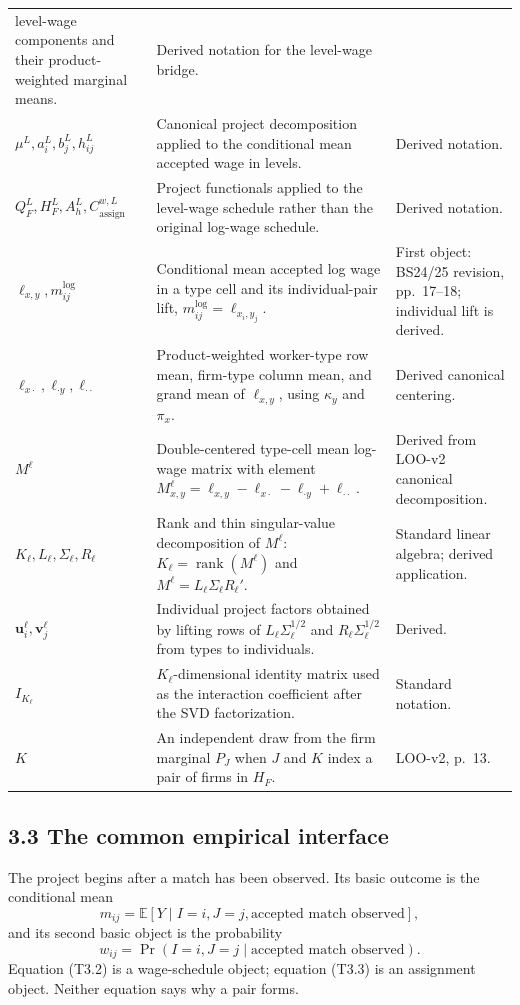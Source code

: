 \documentclass[11pt]{article}
\begin{document}
\begin{longtable}{p{}p{}p{}}
level-wage components and their product-weighted marginal means. & Derived
notation for the level-wage bridge. \\
\(\mu^L,a_i^L,b_j^L,h_{ij}^L\) & Canonical project decomposition applied to
the conditional mean accepted wage in levels. & Derived notation. \\
\(Q_F^L,H_F^L,A_h^L,C_{\mathrm{assign}}^{w,L}\) & Project functionals applied
to the level-wage schedule rather than the original log-wage schedule. &
Derived notation. \\
\(\ell_{x,y},m^{\log}_{ij}\) & Conditional mean accepted log wage in a type
cell and its individual-pair lift,
\(m^{\log}_{ij}=\ell_{x_i,y_j}\). & First object: BS24/25 revision,
pp.\ 17--18; individual lift is derived. \\
\(\ell_{x\cdot},\ell_{\cdot y},\ell_{\cdot\cdot}\) & Product-weighted
worker-type row mean, firm-type column mean, and grand mean of
\(\ell_{x,y}\), using \(\kappa_y\) and \(\pi_x\). & Derived canonical
centering. \\
\(M^\ell\) & Double-centered type-cell mean log-wage matrix with element
\(M^\ell_{x,y}=\ell_{x,y}-\ell_{x\cdot}-\ell_{\cdot y}
+\ell_{\cdot\cdot}\). & Derived from LOO-v2 canonical decomposition. \\
\(K_\ell,L_\ell,\Sigma_\ell,R_\ell\) & Rank and thin singular-value
decomposition of \(M^\ell\):
\(K_\ell=\operatorname{rank}(M^\ell)\) and
\(M^\ell=L_\ell\Sigma_\ell R_\ell'\). & Standard linear algebra; derived
application. \\
\(\mathbf u_i^\ell,\mathbf v_j^\ell\) & Individual project factors obtained
by lifting rows of \(L_\ell\Sigma_\ell^{1/2}\) and
\(R_\ell\Sigma_\ell^{1/2}\) from types to individuals. & Derived. \\
\(I_{K_\ell}\) & \(K_\ell\)-dimensional identity matrix used as the
interaction coefficient after the SVD factorization. & Standard notation. \\
\(K\) & An independent draw from the firm marginal \(P_J\) when \(J\) and
\(K\) index a pair of firms in \(H_F\). & LOO-v2, p.\ 13. \\
\end{longtable}

\subsection{3.3 The common empirical interface}

The project begins after a match has been observed.  Its basic outcome is the
conditional mean
\[
m_{ij}
=
\mathbb E[
  Y\mid I=i,J=j,\text{accepted match observed}
],
\tag{T3.2}
\]
and its second basic object is the probability
\[
w_{ij}
=
\Pr(I=i,J=j\mid\text{accepted match observed}).
\tag{T3.3}
\]
Equation (T3.2) is a wage-schedule object; equation (T3.3) is an assignment
object.  Neither equation says why a pair forms.
\end{document}
